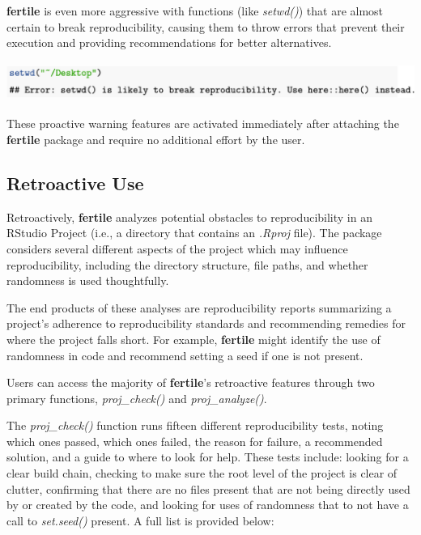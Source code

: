 \documentclass[APA,LATO1COL]{WileyNJD-v2}
\begin{document}
\vskip 0.25in


\textbf{fertile} is even more aggressive with functions (like \textit{setwd()}) that are almost certain to break reproducibility, causing them to throw errors that prevent their execution and providing recommendations for better alternatives.

\vskip 0.25in

\centerline{\includegraphics[height=3pc,width=180mm]{fig-3}}

\vskip 0.25in

These proactive warning features are activated immediately after attaching the \textbf{fertile} package and require no additional effort by the user.

\subsection{Retroactive Use}

Retroactively, \textbf{fertile} analyzes potential obstacles to reproducibility in an RStudio Project (i.e., a directory that contains an \textit{.Rproj} file). The package considers several different aspects of the project which may influence reproducibility, including the directory structure, file paths, and whether randomness is used thoughtfully.

The end products of these analyses are reproducibility reports summarizing a project's adherence to reproducibility standards and recommending remedies for where the project falls short. For example, \textbf{fertile} might identify the use of randomness in code and recommend setting a seed if one is not present.

Users can access the majority of \textbf{fertile}'s retroactive features through two primary functions, \textit{proj\_check()} and \textit{proj\_analyze()}.

The \textit{proj\_check()} function runs fifteen different reproducibility tests, noting which ones passed, which ones failed, the reason for failure, a recommended solution, and a guide to where to look for help. These tests include: looking for a clear build chain, checking to make sure the root level of the project is clear of clutter, confirming that there are no files present that are not being directly used by or created by the code, and looking for uses of randomness that to not have a call to \textit{set.seed()} present. A full list is provided below:
\end{document}
